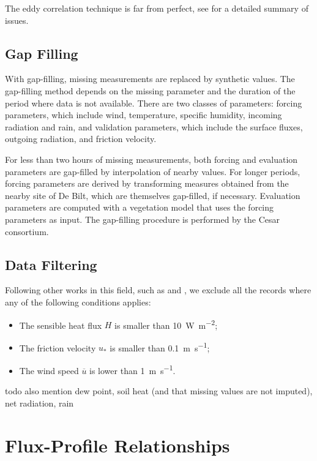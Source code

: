 \documentclass[12pt]{book}
\begin{document}
The eddy correlation technique is far from perfect, see \cite{microhandbook} for a detailed summary of issues.

\subsection{Gap Filling}
\label{sec:gap_filling}
With gap-filling, missing measurements are replaced by synthetic values. The gap-filling method depends on the missing parameter and the duration of the period where data is not available. There are two classes of parameters: forcing parameters, which include wind, temperature, specific humidity, incoming radiation and rain, and validation parameters, which include the surface fluxes, outgoing radiation, and friction velocity.

For less than two hours of missing measurements, both forcing and evaluation parameters are gap-filled by interpolation of nearby values. For longer periods, forcing parameters are derived by transforming measures obtained from the nearby site of De Bilt, which are themselves gap-filled, if necessary. Evaluation parameters are computed with a vegetation model that uses the forcing parameters as input. The gap-filling procedure is performed by the Cesar consortium.


\subsection{Data Filtering}
\label{sec:data_filter}
Following other works in this field, such as \cite{boulder} and \cite{hogstrom88}, we exclude all the records where any of the following conditions applies:

\begin{itemize}
\item The sensible heat flux $H$ is smaller than \SI{10}{\watt\per\square\meter};
\item The friction velocity $u_*$ is smaller than \SI{0.1}{\meter\per\second};
\item The wind speed $\overline{u}$ is lower than \SI{1}{\meter\per\second}.
\end{itemize}

todo also mention dew point, soil heat (and that missing values are not imputed), net radiation, rain

\section{Flux-Profile Relationships}
\label{sec:profiles}
\end{document}
